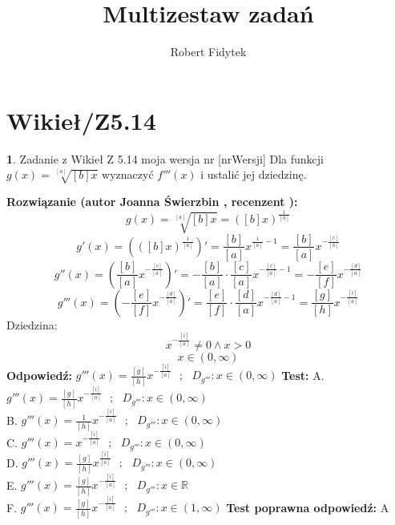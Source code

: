 \documentclass[12pt, a4paper]{article}
\title{Multizestaw zadań}
\author{Robert Fidytek}
\date{}
\theoremstyle{definition} %
\newtheorem{zad}{}
\newcommand{\kategoria}[1]{\section{#1}} %
\newcommand{\zadStart}[1]{\begin{zad}#1\newline} %
\newcommand{\zadStop}{\end{zad}}   %
\newcommand{\rozwStart}[2]{\noindent \textbf{Rozwiązanie (autor #1 , recenzent #2): }\newline} %
\newcommand{\rozwStop}{\newline}                                            %
\newcommand{\odpStart}{\noindent \textbf{Odpowiedź:}\newline}    %
\newcommand{\odpStop}{\newline}                                             %
\newcommand{\testStart}{\noindent \textbf{Test:}\newline} %
\newcommand{\testStop}{\newline} %
\newcommand{\kluczStart}{\noindent \textbf{Test poprawna odpowiedź:}\newline} %
\newcommand{\kluczStop}{\newline} %
\begin{document}
\maketitle


\kategoria{Wikieł/Z5.14}
\zadStart{Zadanie z Wikieł Z 5.14 moja wersja nr [nrWersji]}
Dla funkcji $g(x)=\sqrt[{[a]}]{[b]x}$ wyznaczyć $ f'''(x)$ i ustalić jej dziedzinę.
\zadStop
\rozwStart{Joanna Świerzbin}{}
$$g(x)=\sqrt[{[a]}]{[b]x} = ([b]x)^{\frac{1}{[a]}}$$
$$g'(x)= \left( ([b]x)^{\frac{1}{[a]}} \right)' = \frac{[b]}{[a]}x^{\frac{1}{[a]}-1} = \frac{[b]}{[a]}x^{-\frac{[c]}{[a]}} $$
$$g''(x)= \left( \frac{[b]}{[a]}x^{-\frac{[c]}{[a]}} \right)'= -\frac{[b]}{[a]}\cdot \frac{[c]}{[a]}x^{-\frac{[c]}{[a]}-1}= -\frac{[e]}{[f]} x^{-\frac{[d]}{[a]}}$$
$$g'''(x)= \left( -\frac{[e]}{[f]} x^{-\frac{[d]}{[a]}} \right)'= \frac{[e]}{[f]}\cdot \frac{[d]}{[a]} x^{-\frac{[d]}{[a]}-1} = \frac{[g]}{[h]} x^{-\frac{[i]}{[a]}} $$
Dziedzina:
$$ x^{-\frac{[i]}{[a]}} \neq 0 \land x>0$$
$$ x \in ( 0, \infty ) $$
\rozwStop
\odpStart
$g'''(x)=  \frac{[g]}{[h]} x^{-\frac{[i]}{[a]}}\ \ \  ; \ \ \ D_{g'''} : x \in ( 0, \infty ) $
\odpStop
\testStart
A. $g'''(x)=  \frac{[g]}{[h]} x^{-\frac{[i]}{[a]}}\ \ \  ; \ \ \ D_{g'''} : x \in ( 0, \infty ) $\\
B. $g'''(x)=  \frac{1}{[h]} x^{-\frac{[i]}{[a]}}\ \ \  ; \ \ \ D_{g'''} : x \in ( 0, \infty ) $ \\
C. $g'''(x)=  x^{-\frac{[i]}{[a]}}\ \ \  ; \ \ \ D_{g'''} : x \in ( 0, \infty ) $ \\
D. $g'''(x)=  \frac{[g]}{[h]} x^{\frac{[i]}{[a]}}\ \ \  ; \ \ \ D_{g'''} : x \in ( 0, \infty ) $\\
E. $g'''(x)=  \frac{[g]}{[h]} x^{-\frac{[i]}{[a]}}\ \ \  ; \ \ \ D_{g'''} : x \in \mathbb{R} $\\
F. $g'''(x)=  \frac{[g]}{[h]} x^{-\frac{[i]}{[a]}}\ \ \  ; \ \ \ D_{g'''} : x \in ( 1, \infty ) $
\testStop
\kluczStart
A
\kluczStop
\end{document}
